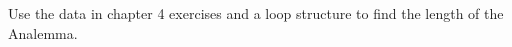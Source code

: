 {Use the data in chapter 4 exercises and a loop structure to find the length of the Analemma. }
{}


